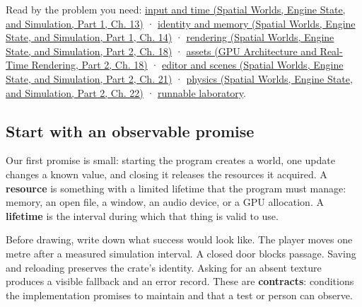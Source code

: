 Read by the problem you need: \href{../05-Spatial-Worlds-Engine-State-and-Simulation-P01/main.pdf\#05-engine-i-ch013-let-one-input-produce-one-intended-change}{input and time (Spatial Worlds, Engine State, and Simulation, Part 1, Ch. 13)} · \href{../05-Spatial-Worlds-Engine-State-and-Simulation-P01/main.pdf\#05-engine-i-ch014-keep-identity-storage-and-ownership-in-agreement}{identity and memory (Spatial Worlds, Engine State, and Simulation, Part 1, Ch. 14)} · \href{../05-Spatial-Worlds-Engine-State-and-Simulation-P02/main.pdf\#05-engine-i-ch018-give-the-renderer-a-clear-job-then-meet-the-graphics-api}{rendering (Spatial Worlds, Engine State, and Simulation, Part 2, Ch. 18)} · \href{../06-GPU-Architecture-and-Real-Time-Rendering-P02/main.pdf\#06-engine-ii-ch027-prepare-and-publish-content-before-promising-it-is-ready}{assets (GPU Architecture and Real-Time Rendering, Part 2, Ch. 18)} · \href{../05-Spatial-Worlds-Engine-State-and-Simulation-P02/main.pdf\#06-engine-ii-ch031-make-a-world-that-can-be-authored-saved-and-run}{editor and scenes (Spatial Worlds, Engine State, and Simulation, Part 2, Ch. 21)} · \href{../05-Spatial-Worlds-Engine-State-and-Simulation-P02/main.pdf\#06-engine-ii-ch033-let-motion-and-contact-answer-the-same-world-rules}{physics (Spatial Worlds, Engine State, and Simulation, Part 2, Ch. 22)} · \hyperref[06-engine-ii-ch042-reconstruct-the-working-loop-and-test-its-contracts]{runnable laboratory}.

\subsection{Start with an observable promise}\label{05-engine-i-ch001-start-with-an-observable-promise}

\hypertarget{05-engine-i-ch001-start-with-an-observable-promise}{}

Our first promise is small: starting the program creates a world, one update changes a known value, and closing it releases the resources it acquired. A \textbf{resource} is something with a limited lifetime that the program must manage: memory, an open file, a window, an audio device, or a GPU allocation. A \textbf{lifetime} is the interval during which that thing is valid to use.

Before drawing, write down what success would look like. The player moves one metre after a measured simulation interval. A closed door blocks passage. Saving and reloading preserves the crate's identity. Asking for an absent texture produces a visible fallback and an error record. These are \textbf{contracts}: conditions the implementation promises to maintain and that a test or person can observe.

